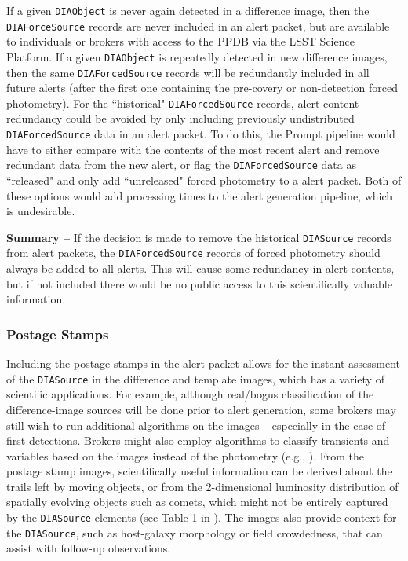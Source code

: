\documentclass[DM,lsstdraft,authoryear,toc]{lsstdoc}
\begin{document}
If a given {\tt DIAObject} is never again detected in a difference image, then the {\tt DIAForceSource} records are never included in an alert packet, but are available to individuals or brokers with access to the PPDB via the LSST Science Platform.
If a given {\tt DIAObject} is repeatedly detected in new difference images, then the same {\tt DIAForcedSource} records will be redundantly included in all future alerts (after the first one containing the pre-covery or non-detection forced photometry).
For the ``historical" {\tt DIAForcedSource} records, alert content redundancy could be avoided by only including previously undistributed {\tt DIAForcedSource} data in an alert packet.
To do this, the Prompt pipeline would have to either compare with the contents of the most recent alert and remove redundant data from the new alert, or flag the {\tt DIAForcedSource} data as ``released" and only add ``unreleased" forced photometry to a alert packet.
Both of these options would add processing times to the alert generation pipeline, which is undesirable.

{\bf Summary --} If the decision is made to remove the historical {\tt DIASource} records from alert packets, the {\tt DIAForcedSource} records of forced photometry should always be added to all alerts.
This will cause some redundancy in alert contents, but if not included there would be no public access to this scientifically valuable information.

\subsubsection{Postage Stamps}\label{sssec:packets_remove_stamps}

Including the postage stamps in the alert packet allows for the instant assessment of the {\tt DIASource} in the difference and template images, which has a variety of scientific applications.
For example, although real/bogus classification of the difference-image sources will be done prior to alert generation, some brokers may still wish to run additional algorithms on the images -- especially in the case of first detections.
Brokers might also employ algorithms to classify transients and variables based on the images instead of the photometry (e.g., \citealt{2019PASP..131j8006C}).
From the postage stamp images, scientifically useful information can be derived about the trails left by moving objects, or from the 2-dimensional luminosity distribution of spatially evolving objects such as comets, which might not be entirely captured by the {\tt DIASource} elements (see Table 1 in ).
The images also provide context for the {\tt DIASource}, such as host-galaxy morphology or field crowdedness, that can assist with follow-up observations.
\end{document}
